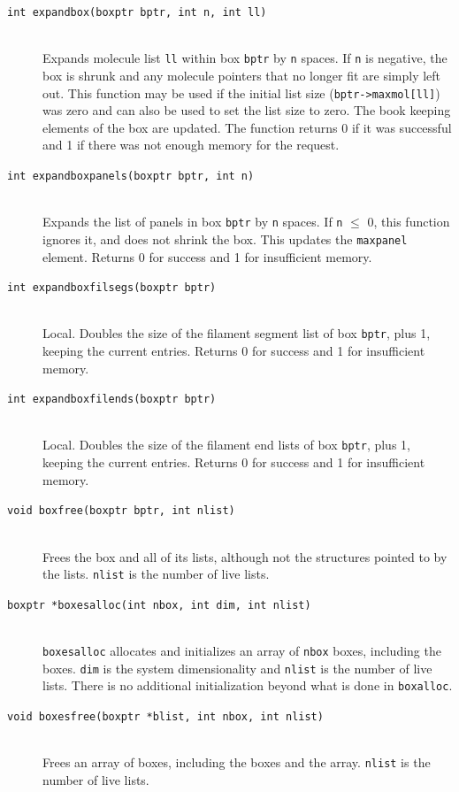 \documentclass {scrbook}
\newcommand {\ttt} {\texttt}
\begin{document}
\begin{description}
\item[\ttt{int expandbox(boxptr bptr, int n, int ll)}]
\hfill \\
Expands molecule list \ttt{ll} within box \ttt{bptr} by \ttt{n} spaces. If \ttt{n} is negative, the box is shrunk and any molecule pointers that no longer fit are simply left out. This function may be used if the initial list size (\ttt{bptr->maxmol[ll]}) was zero and can also be used to set the list size to zero. The book keeping elements of the box are updated. The function returns 0 if it was successful and 1 if there was not enough memory for the request.

\item[\ttt{int expandboxpanels(boxptr bptr, int n)}]
\hfill \\
Expands the list of panels in box \ttt{bptr} by \ttt{n} spaces. If \ttt{n} $\leq$ 0, this function ignores it, and does not shrink the box. This updates the \ttt{maxpanel} element. Returns 0 for success and 1 for insufficient memory.

\item[\ttt{int expandboxfilsegs(boxptr bptr)}] %
\hfill \\
Local. Doubles the size of the filament segment list of box \ttt{bptr}, plus 1, keeping the current entries. Returns 0 for success and 1 for insufficient memory.

\item[\ttt{int expandboxfilends(boxptr bptr)}] %
\hfill \\
Local. Doubles the size of the filament end lists of box \ttt{bptr}, plus 1, keeping the current entries. Returns 0 for success and 1 for insufficient memory.

\item[\ttt{void boxfree(boxptr bptr, int nlist)}]
\hfill \\
Frees the box and all of its lists, although not the structures pointed to by the lists. \ttt{nlist} is the number of live lists.

\item[\ttt{boxptr *boxesalloc(int nbox, int dim, int nlist)}]
\hfill \\
\ttt{boxesalloc} allocates and initializes an array of \ttt{nbox} boxes, including the boxes. \ttt{dim} is the system dimensionality and \ttt{nlist} is the number of live lists. There is no additional initialization beyond what is done in \ttt{boxalloc}.

\item[\ttt{void boxesfree(boxptr *blist, int nbox, int nlist)}]
\hfill \\
Frees an array of boxes, including the boxes and the array. \ttt{nlist} is the number of live lists.


\end{description}
\end{document}
